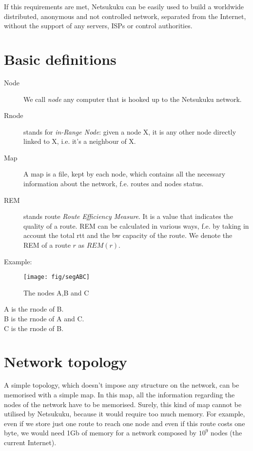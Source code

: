 \documentclass[a4paper]{article}
\begin{document}
If this requirements are met, Netsukuku can be easily used to build a worldwide
distributed, anonymous and not controlled network, separated from the
Internet, without the support of any servers, ISPs or control authorities.

\section{Basic definitions}

\begin{description}
	\item[Node] We call \emph{node} any computer that is hooked up to the
		Netsukuku network.
	\item[Rnode] stands for \emph{in-Range Node}: given a node X, it is any other
		node directly linked to X, i.e. it's a neighbour of X.
	\item[Map] A map is a file, kept by each node, which contains all the
		necessary information about the network, f.e. routes and nodes
		status.
	\item[REM] stands route \emph{Route Efficiency Measure}. It is 
		a value that indicates the quality of a route. 
		REM can be calculated in various ways, f.e. by taking in
		account the total rtt and the bw capacity of the route.  We denote the REM of
a route $r$ as $REM(r)$.

\end{description}
Example:\\
\begin{figure}[h]
	\begin{center}
		\texttt{[image: fig/segABC]}
	\end{center}
	\caption{The nodes A,B and C}
\end{figure}
A is the rnode of B.\\
B is the rnode of A and C.\\
C is the rnode of B.

\section{Network topology}
\label{sec:net_topology}

A simple topology, which doesn't impose any structure on the network, can be
memorised with a simple map. In this map, all the information regarding the
nodes of the network have to be memorised. Surely, this kind of map cannot be
utilised by Netsukuku, because it would require too much memory.
For example, even if we store just one route to reach one node and even if
this route costs one byte, we would need 1Gb of memory for a network composed
by $10^9$ nodes (the current Internet).
\end{document}
